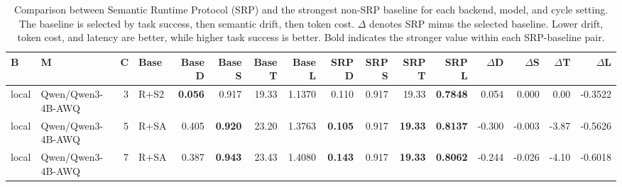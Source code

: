 \begin{table}[t]
\centering
\setlength{\tabcolsep}{2pt}
\scriptsize
\begin{tabular}{llrlrrrrrrrrrrrr}
\toprule
B & M & C & Base & Base D & Base S & Base T & Base L & SRP D & SRP S & SRP T & SRP L & $\Delta$D & $\Delta$S & $\Delta$T & $\Delta$L \\
\midrule
local & Qwen/Qwen3-4B-AWQ & 3 & R+S2 & \textbf{0.056} & 0.917 & 19.33 & 1.1370 & 0.110 & 0.917 & 19.33 & \textbf{0.7848} & 0.054 & 0.000 & 0.00 & -0.3522 \\
local & Qwen/Qwen3-4B-AWQ & 5 & R+SA & 0.405 & \textbf{0.920} & 23.20 & 1.3763 & \textbf{0.105} & 0.917 & \textbf{19.33} & \textbf{0.8137} & -0.300 & -0.003 & -3.87 & -0.5626 \\
local & Qwen/Qwen3-4B-AWQ & 7 & R+SA & 0.387 & \textbf{0.943} & 23.43 & 1.4080 & \textbf{0.143} & 0.917 & \textbf{19.33} & \textbf{0.8062} & -0.244 & -0.026 & -4.10 & -0.6018 \\
\bottomrule
\end{tabular}
\caption{Comparison between Semantic Runtime Protocol (SRP) and the strongest non-SRP baseline for each backend, model, and cycle setting. The baseline is selected by task success, then semantic drift, then token cost. $\Delta$ denotes SRP minus the selected baseline. Lower drift, token cost, and latency are better, while higher task success is better. Bold indicates the stronger value within each SRP-baseline pair.}
\label{tab:srp-camera-ready-table}
\end{table}
